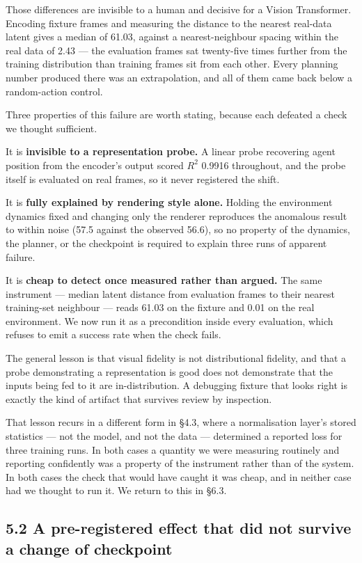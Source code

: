 \documentclass[10pt]{article}
\begin{document}
Those differences are invisible to a human and decisive for a Vision
Transformer. Encoding fixture frames and measuring the distance to the nearest
real-data latent gives a median of 61.03, against a nearest-neighbour spacing
within the real data of 2.43 --- the evaluation frames sat twenty-five times
further from the training distribution than training frames sit from each
other. Every planning number produced there was an extrapolation, and all of
them came back below a random-action control.

Three properties of this failure are worth stating, because each defeated a
check we thought sufficient.

It is \textbf{invisible to a representation probe.} A linear probe recovering agent
position from the encoder's output scored $R^{2}$ 0.9916 throughout, and the probe
itself is evaluated on real frames, so it never registered the shift.

It is \textbf{fully explained by rendering style alone.} Holding the environment
dynamics fixed and changing only the renderer reproduces the anomalous result to
within noise (57.5 against the observed 56.6), so no property of the dynamics,
the planner, or the checkpoint is required to explain three runs of apparent
failure.

It is \textbf{cheap to detect once measured rather than argued.} The same
instrument --- median latent distance from evaluation frames to their nearest
training-set neighbour --- reads 61.03 on the fixture and 0.01 on the real
environment. We now run it as a precondition inside every evaluation, which
refuses to emit a success rate when the check fails.

The general lesson is that visual fidelity is not distributional fidelity, and
that a probe demonstrating a representation is good does not demonstrate that
the inputs being fed to it are in-distribution. A debugging fixture that looks
right is exactly the kind of artifact that survives review by inspection.

That lesson recurs in a different form in \S{}4.3, where a normalisation layer's
stored statistics --- not the model, and not the data --- determined a reported
loss for three training runs. In both cases a quantity we were measuring
routinely and reporting confidently was a property of the instrument rather than
of the system. In both cases the check that would have caught it was cheap, and
in neither case had we thought to run it. We return to this in \S{}6.3.

\subsection{5.2 A pre-registered effect that did not survive a change of checkpoint}\label{a-pre-registered-effect-that-did-not-survive-a-change-of-checkpoint}
\end{document}
